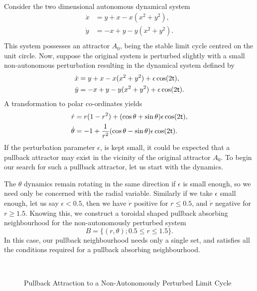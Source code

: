  \begin{eg} \hfill \\ \label{per2deg}
  Consider the two dimensional autonomous dynamical system
  \begin{align*}
    \dot{x} &= y + x - x(x^{2} + y^{2}), \\
    \dot{y} &= -x +y - y(x^{2} + y^{2}). \\
  \end{align*}
  This system possesses an attractor $A_0$, being the stable limit
  cycle centred on the unit circle. Now, suppose the original system is
  perturbed slightly with a small non-autonomous perturbation resulting in
  the dynamical system defined by
  \begin{align*}
    \dot{x} &= y + x - x(x^{2} + y^{2}) + \epsilon \cos(2 \mathsf{\mathsf{t}}), \\
    \dot{y} &= -x +y - y(x^{2} + y^{2}) + \epsilon \cos(2 \mathsf{\mathsf{t}}). \\
  \end{align*}
  A transformation to polar co-ordinates yields
  \begin{align*}
    \dot{r} &= r(1-r^2) + (\cos \theta + \sin \theta) \epsilon \cos(2 \mathsf{\mathsf{t}}), \\
    \dot{\theta} &= -1 + \frac{1}{r^2} (\cos \theta - \sin \theta) \epsilon
                             \cos(2 \mathsf{\mathsf{t}}). \\
  \end{align*}
  If the perturbation parameter $\epsilon$, is kept small, it could be
  expected that a pullback attractor may exist in the vicinity of the original
  attractor $A_0$. To begin our search for such a pullback attractor, let us
  start with the dynamics.

  The $\theta$ dynamics remain rotating in the same
  direction if $\epsilon$ is small enough, so we need only be concerned with
  the radial variable. Similarly if we take $\epsilon$ small enough, let us
  say $\epsilon < 0.5$, then we have $\dot{r}$ positive for $r \leq 0.5$, and
  $\dot{r}$ negative for $r \geq 1.5$. Knowing this, we construct a
  toroidal shaped pullback absorbing neighbourhood for the non-autonomously perturbed
  system
  \[ B = \{ (r,\theta) ; 0.5 \leq r \leq 1.5 \}. \]
  In this case, our pullback neighbourhood needs only a single set, and
  satisfies all the conditions required for a pullback absorbing
  neighbourhood.

    \begin{figure}[htb]
  \begin{center}
  \leavevmode
  \hbox{
  \epsfxsize=9.5cm
    }%
  \protect\caption{Pullback Attraction to a Non-Autonomously
                          Perturbed Limit Cycle}
        \protect\label{per2dpic}
  \end{center}
  \end{figure}


\end{eg}
